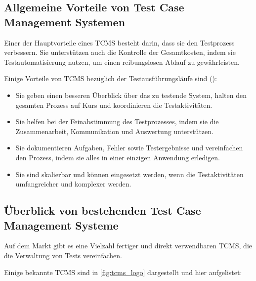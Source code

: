 \documentclass[a4paper, fontsize=11pt, parskip=half, twoside]{scrreprt}
\begin{document}
	
	\subsection{Allgemeine Vorteile von Test Case Management Systemen}
	Einer der Hauptvorteile eines \ac{TCMS} besteht darin, dass sie den Testprozess verbessern. 
	Sie unterstützen auch die Kontrolle der Gesamtkosten, indem sie Testautomatisierung nutzen, um einen reibungslosen Ablauf zu gewährleisten.  
	
	Einige Vorteile von \ac{TCMS} bezüglich der Testausführungsläufe sind (\textcite{lead_articles_nodate}):
	
	\begin{itemize}
		\item Sie geben einen besseren Überblick über das zu testende System, halten den gesamten Prozess auf Kurs und koordinieren die Testaktivitäten.
		\item Sie helfen bei der Feinabstimmung des Testprozesses, indem sie die Zusammenarbeit, Kommunikation und Auswertung unterstützen.
		\item Sie dokumentieren Aufgaben, Fehler sowie Testergebnisse und vereinfachen den Prozess, indem sie alles in einer einzigen Anwendung erledigen.
		\item Sie sind skalierbar und können eingesetzt werden, wenn die Testaktivitäten umfangreicher und komplexer werden.
	\end{itemize}
	
	
	\subsection{Überblick von bestehenden Test Case Management Systeme}
	Auf dem Markt gibt es eine Vielzahl fertiger und direkt verwendbaren \ac{TCMS}, die die Verwaltung von Tests vereinfachen.
	
	Einige bekannte \ac{TCMS} sind in \autoref{fig:tcms_logo} dargestellt und hier aufgelistet:
	
\end{document}
